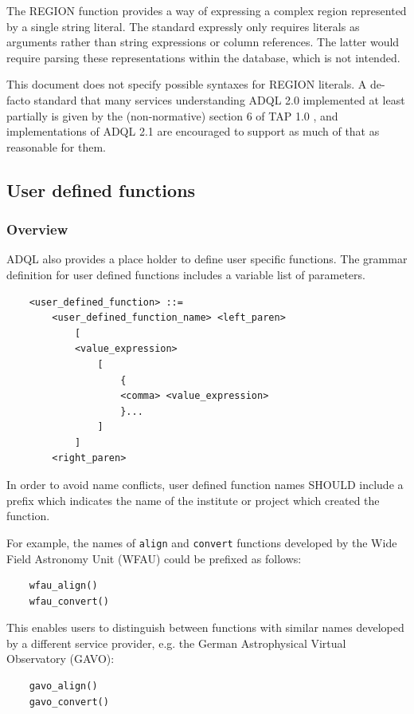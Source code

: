 \documentclass[11pt,a4paper]{ivoa}
\begin{document}
The REGION function provides a way of expressing a complex region
represented by a single string literal.  The standard expressly only
requires literals as arguments rather than string expressions or column
references.  The latter would require parsing these representations
within the database, which is not intended.

This document does not specify possible syntaxes for REGION
literals.  A de-facto standard that many services understanding ADQL 2.0
implemented at least partially is given by the (non-normative) section 6
of TAP 1.0 \citep{2010ivoa.spec.0327D}, and implementations of ADQL 2.1 are
encouraged to support as much of that as reasonable for them.

\subsection{User defined functions}
\label{sec:user.functions}
\subsubsection{Overview}

ADQL also provides a place holder to define user specific functions. The grammar
definition for user defined functions includes a variable list of parameters.

\begin{verbatim}
    <user_defined_function> ::=
        <user_defined_function_name> <left_paren>
            [
            <value_expression>
                [
                    {
                    <comma> <value_expression>
                    }...
                ]
            ]
        <right_paren>
\end{verbatim}

In order to avoid name conflicts, user defined function names SHOULD include
a prefix which indicates the name of the institute or project which created
the function.

For example, the names of \verb:align: and \verb:convert: functions developed
by the Wide Field Astronomy Unit (WFAU) could be prefixed as follows:
\begin{verbatim}
    wfau_align()
    wfau_convert()
\end{verbatim}

This enables users to distinguish between functions with similar names developed
by a different service provider, e.g. the German Astrophysical Virtual
Observatory (GAVO):
\begin{verbatim}
    gavo_align()
    gavo_convert()
\end{verbatim}
\end{document}

